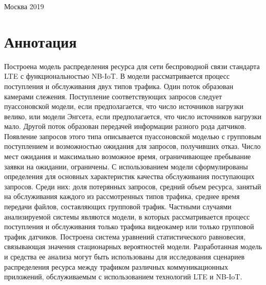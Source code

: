 \documentclass[12pt,a4paper,oneside]{article}
\begin{document}
    \linespread{1.3}    
	\hfill \break
	\hfill \break
	\hfill \break
	\hfill \break
	\hfill \break
	\hfill \break
	\hfill \break
	\begin{center} Москва 2019 \end{center}
	\thispagestyle{empty}

	
\newpage
\section{Аннотация}
Построена модель распределения ресурса для сети беспроводной связи стандарта LTE с функциональностью NB-IoT. В модели рассматривается процесс поступления и обслуживания двух типов трафика. Один поток образован камерами слежения. Поступление соответствующих запросов следует пуассоновской модели, если предполагается, что число источников нагрузки велико, или модели Энгсета, если предполагается, что число источников нагрузки мало.  Другой поток образован передачей информации разного рода датчиков. Появление запросов этого типа описывается пуассоновской моделью с групповым поступлением и возможностью ожидания для запросов, получивших отказ. Число мест ожидания и максимально возможное время, ограничивающее пребывание заявки на ожидании, ограничены.  С использованием модели сформулированы определения для основных характеристик качества обслуживания поступающих запросов. Среди них: доля потерянных запросов, средний объем ресурса, занятый на обслуживания каждого из рассмотренных типов трафика, среднее время передачи файлов, составляющих групповой трафик. Частными случаями анализируемой системы являются модели, в которых рассматривается процесс поступления и обслуживания только трафика видеокамер или только групповой трафик датчиков. Построена система уравнений статистического равновесия, связывающая значения стационарных вероятностей модели.  Разработанная модель и средства ее анализа могут быть использованы для исследования сценариев распределения ресурса между трафиком различных коммуникационных приложений, обслуживаемым с использованием технологий LTE и NB-IoT.
	
	
\end{document}
